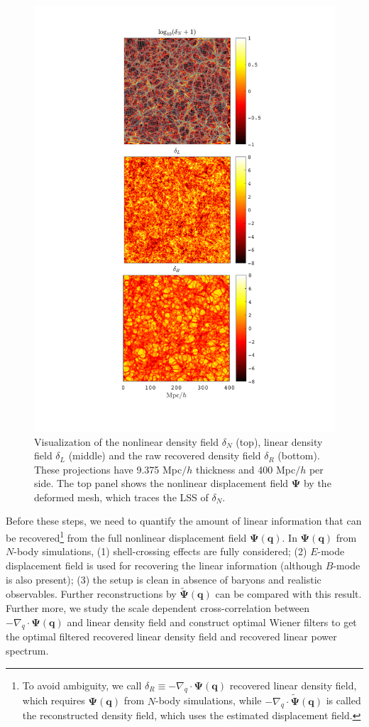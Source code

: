 \documentclass[aps,prd,twocolumn,superscriptaddress,amsfont,amssymb,amsmath,nofootinbib,showpacs,balancelastpage]{revtex4-1}
\newcommand{\bs}{\boldsymbol}
\begin{document}
\begin{figure}
 \centering
  \includegraphics[width=0.95\linewidth]{proj.pdf}
  \caption{Visualization of the nonlinear density field $\delta_N$ (top),
  linear density field $\delta_L$ (middle) and the raw recovered density
  field $\delta_R$ (bottom). These projections have 9.375 Mpc$/h$ thickness
  and 400 Mpc$/h$ per side. The top panel shows the nonlinear displacement
  field $\bs\Psi$ by the deformed mesh, which traces the LSS of $\delta_N$.}
  \label{fig.projection}
\end{figure}

Before these steps, we need to quantify the amount of linear information
that can be recovered\footnote{To avoid ambiguity, we call
$\delta_R\equiv-\nabla_q\cdot\bs\Psi(\bs q)$ recovered linear density field, which
requires $\bs\Psi(\bs q)$ from $N$-body simulations, while
$-\nabla_q\cdot\tilde{\bs \Psi}(\bs q)$ is called the
reconstructed density field, which uses the estimated displacement field.}
 from the full nonlinear displacement field $\bs\Psi(\bs q)$.
In $\bs\Psi(\bs q)$ from $N$-body simulations,
(1) shell-crossing effects are fully considered; (2) $E$-mode displacement
field is used for recovering the linear information (although $B$-mode is
also present); (3) the setup is clean in absence of baryons and realistic
observables. Further reconstructions by $\tilde{\bs \Psi}(\bs q)$
can be compared with this result.
Further more, we study the scale dependent cross-correlation
between $-\nabla_q\cdot\bs\Psi(\bs q)$ and linear density field
and construct optimal Wiener filters to get the optimal filtered
recovered linear density field and recovered linear power spectrum.
\end{document}
